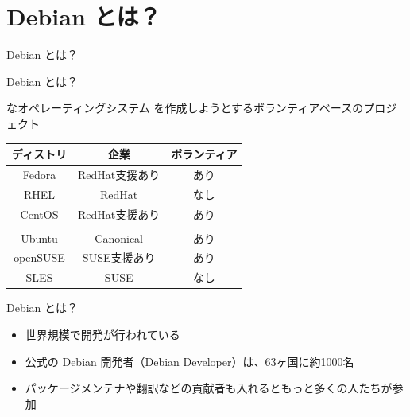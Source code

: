 
\section{Debian とは？}

\begin{frame}
  \begin{center}\Huge{Debian とは？}\end{center}
\end{frame}


\begin{frame}{Debian とは？}

{\color{red}{フリー/オープン}}な{\color{red}{ユニバーサル}}オペレーティングシステム を作成しようとするボランティアベースのプロジェクト

\begin{table}[htb]
  \begin{tabular}{|c|c|c|}
    \hline
    ディストリ & 企業 & ボランティア \\ \hline
    Fedora & RedHat支援あり & あり  \\ \hline
    RHEL & RedHat & なし  \\ \hline
    CentOS & RedHat支援あり & あり \\ \hline
    \color{red}{Debian}  & \color{red}{なし} & \color{red}{あり} \\ \hline
    Ubuntu  & Canonical & あり \\ \hline
    openSUSE & SUSE支援あり & あり \\ \hline
    SLES & SUSE & なし \\ \hline
  \end{tabular}
\end{table}

\end{frame}

\begin{frame}{Debian とは？}

\begin{itemize}
\item 世界規模で開発が行われている
\item 公式の Debian 開発者（Debian Developer）は、63ヶ国に約1000名
\item パッケージメンテナや翻訳などの貢献者も入れるともっと多くの人たちが参加
\end{itemize}
  
\end{frame}


